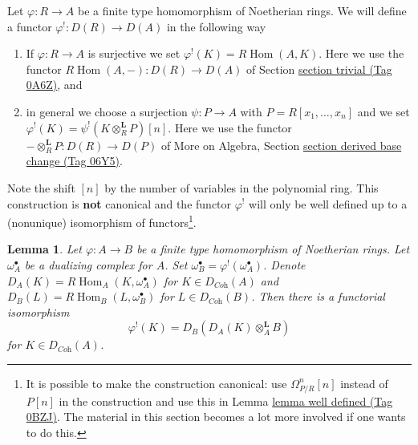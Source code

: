 \documentclass{amsart}
\theoremstyle{plain}
\newtheorem{lemma}[subsection]{Lemma}
\theoremstyle{definition}
\theoremstyle{remark}
\numberwithin{equation}{subsection}
\def\Hom{\mathop{\mathrm{Hom}}\nolimits}
\begin{document}
\medskip\noindent
Let $\varphi : R \to A$ be a finite type homomorphism of Noetherian rings.
We will define a functor $\varphi^! : D(R) \to D(A)$ in the following way
\begin{enumerate}
\item If $\varphi : R \to A$ is surjective we set
$\varphi^!(K) = R\Hom(A, K)$. Here we use the functor
$R\Hom(A, -) : D(R) \to D(A)$ of
Section \href{https://stacks.math.columbia.edu/tag/0A6Z}{section trivial (Tag 0A6Z)}, and
\item in general we choose a surjection $\psi : P \to A$ with
$P = R[x_1, \ldots, x_n]$ and we set
$\varphi^!(K) = \psi^!(K \otimes_R^\mathbf{L} P)[n]$.
Here we use the functor
$- \otimes_R^\mathbf{L} P : D(R) \to D(P)$
of More on Algebra, Section \href{https://stacks.math.columbia.edu/tag/06Y5}{section derived base change (Tag 06Y5)}.
\end{enumerate}
Note the shift $[n]$ by the number of variables in the polynomial
ring. This construction is {\bf not} canonical and the functor
$\varphi^!$ will only be well defined up to a (nonunique) isomorphism of
functors\footnote{It is possible to make the construction canonical:
use $\Omega^n_{P/R}[n]$ instead of $P[n]$ in the
construction and use this in Lemma \href{https://stacks.math.columbia.edu/tag/0BZJ}{lemma well defined (Tag 0BZJ)}.
The material in this section becomes a lot more involved
if one wants to do this.}.



\begin{lemma}
\label{lemma-relative-dualizing-if-have-omega}
Let $\varphi : A \to B$ be a finite type homomorphism of Noetherian rings.
Let $\omega_A^\bullet$ be a dualizing complex for $A$. Set
$\omega_B^\bullet = \varphi^!(\omega_A^\bullet)$. Denote
$D_A(K) = R\Hom_A(K, \omega_A^\bullet)$ for $K \in D_{\textit{Coh}}(A)$
and
$D_B(L) = R\Hom_B(L, \omega_B^\bullet)$ for $L \in D_{\textit{Coh}}(B)$.
Then there is a functorial isomorphism
$$
\varphi^!(K) = D_B(D_A(K) \otimes_A^\mathbf{L} B)
$$
for $K \in D_{\textit{Coh}}(A)$.
\end{lemma}
\end{document}
